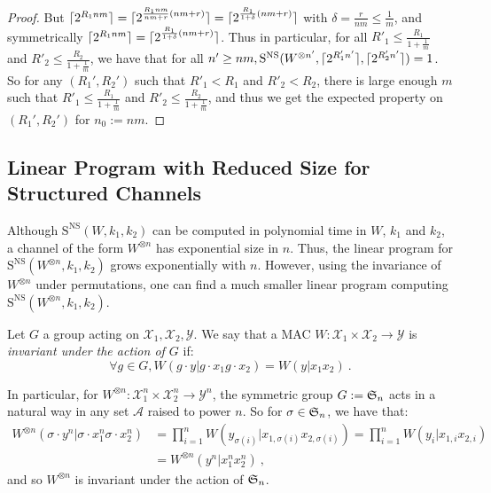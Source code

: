 \begin{proof}
  But $\lceil2^{R_1nm}\rceil = \lceil2^{\frac{R_1nm}{nm+r}(nm+r)}\rceil = \lceil2^{\frac{R_1}{1+\delta}(nm+r)}\rceil$ with $\delta = \frac{r}{nm} \leq \frac{1}{m}$, and symmetrically $\lceil2^{R_1nm}\rceil = \lceil2^{\frac{R_1}{1+\delta}(nm+r)}\rceil$. Thus in particular, for all $R'_1 \leq \frac{R_1}{1+\frac{1}{m}}$ and $R'_2 \leq \frac{R_2}{1+\frac{1}{m}}$, we have that for all $n'\geq nm, \mathrm{S}^{\mathrm{NS}}(W^{\otimes n'},\lceil2^{R_1'n'}\rceil,\lceil2^{R_2'n'}\rceil) = 1$. So for any $(R_1',R_2')$ such that $R'_1 < R_1$ and $R'_2 < R_2$, there is large enough $m$ such that $R'_1 \leq \frac{R_1}{1+\frac{1}{m}}$ and $R'_2 \leq \frac{R_2}{1+\frac{1}{m}}$, and thus we get the expected property on $(R_1',R_2')$ for $n_0:=nm$.
\end{proof}

\subsection{Linear Program with Reduced Size for Structured Channels}

Although $\mathrm{S}^{\mathrm{NS}}(W,k_1,k_2)$ can be computed in polynomial time in $W$, $k_1$ and $k_2$, a channel of the form $W^{\otimes n}$ has exponential size in $n$. Thus, the linear program for $\mathrm{S}^{\mathrm{NS}}(W^{\otimes n},k_1,k_2)$ grows exponentially with $n$. However, using the invariance of $W^{\otimes n}$ under permutations, one can find a much smaller linear program computing $\mathrm{S}^{\mathrm{NS}}(W^{\otimes n},k_1,k_2)$.


\begin{definition} Let $G$ a group acting on $\mathcal{X}_1,\mathcal{X}_2,\mathcal{Y}$. We say that a MAC $W : \mathcal{X}_1 \times \mathcal{X}_2 \rightarrow \mathcal{Y}$ is \emph{invariant under the action of $G$} if:
  \[\forall g \in G, W(g \cdot y|g \cdot x_1 g \cdot x_2)=W(y|x_1x_2) \ .\]
\end{definition}

In particular, for  $W^{\otimes n}: \mathcal{X}_1^n \times \mathcal{X}_2^n \rightarrow \mathcal{Y}^n$, the symmetric group $G:=\mathfrak S_n$ acts in a natural way in any set $\mathcal{A}$ raised to power $n$. So for $\sigma \in \mathfrak S_n$, we have that:
\begin{equation}
  \begin{aligned}
    W^{\otimes n}(\sigma \cdot y^n|\sigma \cdot x_1^n \sigma \cdot x_2^n) &= \prod_{i=1}^n W(y_{\sigma(i)}|x_{1,\sigma(i)}x_{2,\sigma(i)}) = \prod_{i=1}^n W(y_{i}|x_{1,i}x_{2,i})\\
    &= W^{\otimes n}(y^n|x_1^nx_2^n) \ ,
  \end{aligned}
\end{equation}
and so $W^{\otimes n}$ is invariant under the action of $\mathfrak S_n$.

